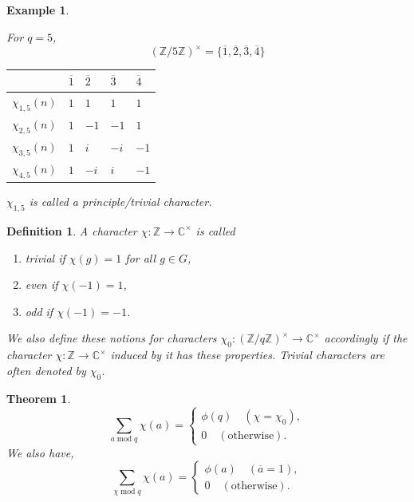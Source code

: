 \documentclass{article}
\newtheorem{theorem}{Theorem} [section]
\newtheorem{definition}{Definition}[section]
\newtheorem{example}{Example}[section]
\DeclareMathOperator{\tmod}{mod}
\newcommand{\Z}[0]{\mathbb{Z}}
\newcommand{\C}[0]{\mathbb{C}}
\begin{document}
\begin{example}
  \label{character_table_5}
   \par For $q=5$, 
  \begin{equation*}
    (\Z/5\Z)^\times = \{\overline{1},\overline{2},\overline{3},\overline{4}\}
  \end{equation*}
  \begin{center}
\begin{tabular}{|l|l|l|l|l|}
\hline
                & $\overline{1}$ & $\overline{2}$ & $\overline{3}$ & $\overline{4}$ \\ \hline
$\chi_{1,5}(n)$ & $1$            & $1$            & $1$            & $1$            \\ \hline
$\chi_{2,5}(n)$ & $1$            & $-1$           & $-1$           & $1$            \\ \hline
$\chi_{3,5}(n)$ & $1$            & $i$            & $-i$           & $-1$           \\ \hline
$\chi_{4,5}(n)$ & $1$            & $-i$           & $i$            & $-1$           \\ \hline
\end{tabular}
  \end{center}
  $\chi_{1,5}$ is called a principle/trivial character. 
\end{example}

\begin{definition}
  A character $\chi:\Z\to\C^\times$ is called 
  \begin{enumerate}[1).]
    \item trivial if $\chi(g) = 1$ for all $g\in G$,
    \item even if $\chi(-1) = 1$,
    \item odd if $\chi(-1) = -1$.
  \end{enumerate}
  We also define these notions for characters $\chi_0:(\Z/q\Z)^\times\to \C^\times$ accordingly if the character $\chi:\Z\to \C^\times$ induced by it has these properties. Trivial characters are often denoted by $\chi_0$.
\end{definition}

\begin{theorem}
  \begin{equation*}
    \sum_{a\tmod q}\chi(a) = \begin{cases}
      \phi(q) \quad (\chi = \chi_0),\\
      0\quad (\text{otherwise}).
    \end{cases}
  \end{equation*}
  We also have,
  \begin{equation*}
    \sum_{\chi \tmod q}\chi(a) = \begin{cases}
      \phi(a) \quad (\overline{a} = 1),\\
      0 \quad(\text{otherwise}).
    \end{cases}
  \end{equation*}
  \label{theorem_sum_character}
\end{theorem}
\end{document}
